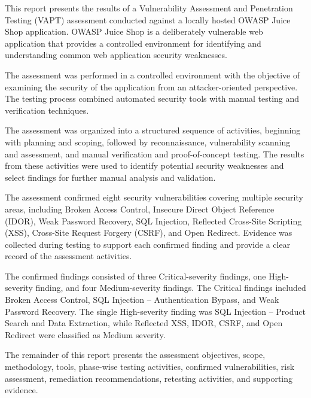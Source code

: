 This report presents the results of a Vulnerability Assessment and
Penetration Testing (VAPT) assessment conducted against a locally
hosted OWASP Juice Shop application. OWASP Juice Shop is a deliberately
vulnerable web application that provides a controlled environment for
identifying and understanding common web application security
weaknesses.

The assessment was performed in a controlled environment with the
objective of examining the security of the application from an
attacker-oriented perspective. The testing process combined automated
security tools with manual testing and verification techniques.

The assessment was organized into a structured sequence of activities,
beginning with planning and scoping, followed by reconnaissance,
vulnerability scanning and assessment, and manual verification and
proof-of-concept testing. The results from these activities were used
to identify potential security weaknesses and select findings for
further manual analysis and validation.

The assessment confirmed eight security vulnerabilities covering
multiple security areas, including Broken Access Control, Insecure
Direct Object Reference (IDOR), Weak Password Recovery, SQL Injection,
Reflected Cross-Site Scripting (XSS), Cross-Site Request Forgery
(CSRF), and Open Redirect. Evidence was collected during testing to
support each confirmed finding and provide a clear record of the
assessment activities.

The confirmed findings consisted of three Critical-severity findings,
one High-severity finding, and four Medium-severity findings. The
Critical findings included Broken Access Control, SQL Injection --
Authentication Bypass, and Weak Password Recovery. The single
High-severity finding was SQL Injection -- Product Search and Data
Extraction, while Reflected XSS, IDOR, CSRF, and Open Redirect were
classified as Medium severity.

The remainder of this report presents the assessment objectives,
scope, methodology, tools, phase-wise testing activities, confirmed
vulnerabilities, risk assessment, remediation recommendations,
retesting activities, and supporting evidence.